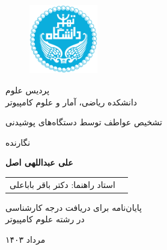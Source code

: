 \documentclass[12pt]{report}
\begin{document}
	
	\begin{figure}
		\centering
		\centering \includegraphics[height=3cm]{Logo.png}
	\end{figure}
	
	\begin{center}
		پردیس علوم
		\\
		دانشکده ریاضی، آمار و علوم کامپیوتر
	\end{center}
	
	\begin{center}
	\end{center}
	
	\begin{center}
		\huge{تشخیص عواطف توسط دستگاه‌های پوشیدنی}
	\end{center}
	
	\begin{center}
	\end{center}
	
	\begin{center}
		نگارنده
	\end{center}
	\begin{center}
		\textbf{
			علی عبداللهی اصل}
	\end{center}
	
	\begin{center}
		\begin{tabular}{rr}
			استاد راهنما: دکتر باقر باباعلی
			
		\end{tabular}
	\end{center}
	
	\vspace{3cm}
	\begin{center}
		پایان‌نامه برای دریافت درجه کارشناسی
		\\
		در رشته علوم کامپیوتر
	\end{center}
	
	\begin{center}
		مرداد ۱۴۰۳
	\end{center}
	
	\pagestyle{empty}
	\pagenumbering{}
	
\end{document}

